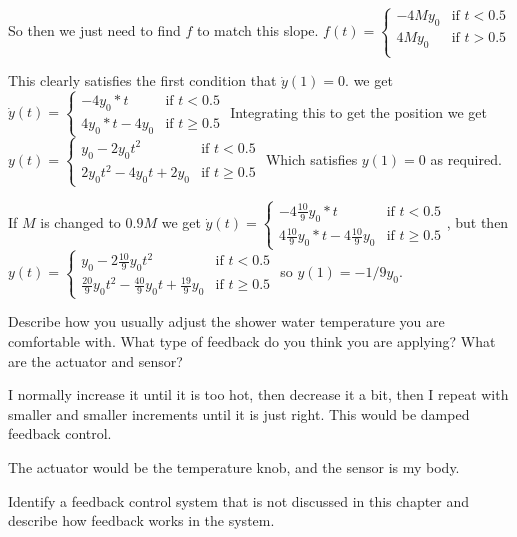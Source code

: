 \documentclass[11pt]{article}
\begin{document}
So then we just need to find $f$ to match this slope.
$f(t) = \begin{cases}
    -4My_0 & \text{if } t < 0.5 \\
    4My_0 & \text{if } t > 0.5 \\
\end{cases}$

This clearly satisfies the first condition that $\dot{y}(1) = 0$.
we get $\dot{y}(t) = \begin{cases}
    -4y_0 * t &\text{if } t < 0.5 \\
    4y_0 * t - 4y_0 &\text{if } t \geq 0.5
\end{cases}$
Integrating this to get the position we get
$y(t) = \begin{cases}
    y_0 - 2 y_0 t^2 &\text{if } t < 0.5 \\
    2y_0t^2 - 4y_0t + 2y_0 &\text{if } t \geq 0.5
\end{cases}$
Which satisfies $y(1)=0$ as required.

If $M$ is changed to $0.9M$ we get 
$\dot{y}(t) = \begin{cases}
    -4 \frac{10}{9} y_0 * t &\text{if } t < 0.5 \\
    4 \frac{10}{9} y_0 * t - 4 \frac{10}{9} y_0 &\text{if } t \geq 0.5
\end{cases}$,
but then\\
$y(t) = \begin{cases}
    y_0 - 2 \frac{10}{9} y_0 t^2 &\text{if } t < 0.5 \\
    \frac{20}{9} y_0t^2 - \frac{40}{9} y_0t + \frac{19}{9} y_0 &\text{if } t \geq 0.5
\end{cases}$
so $y(1) = -1/9 y_0$.


Describe how you usually adjust the shower water temperature you are
comfortable with. What type of feedback do you think you are applying? What are the
actuator and sensor?

\soln

I normally increase it until it is too hot, then decrease it a bit,
then I repeat with smaller and smaller increments until it is just right.
This would be damped feedback control.

The actuator would be the temperature knob, and the sensor is my body.



Identify a feedback control system that is not discussed in this chapter and
describe how feedback works in the system.
\end{document}
